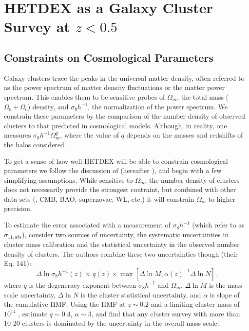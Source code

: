 \section{HETDEX as a Galaxy Cluster Survey at $z < 0.5$}\label{sec:discussion}

\subsection{Constraints on Cosmological Parameters}
Galaxy clusters trace the peaks in the universal matter density, often referred to as the power spectrum of matter density fluctuations or the matter power spectrum. This enables them to be sensitive probes of $\Omega_m$, the total mass ($\Omega_b + \Omega_c$) density, and $\sigma_8h^{-1}$, the normalization of the power spectrum. We constrain these parameters by the comparison of the number density of observed clusters to that predicted in cosmological models. Although, in reality, one measures $\sigma_8h^{-1}\Omega_m^q$, where the value of $q$ depends on the masses and redshifts of the halos considered.

To get a sense of how well HETDEX will be able to constrain cosmological parameters we follow the discussion of \cite{Weinberg2013} (hereafter ), and begin with a few simplifying assumptions. While sensitive to $\Omega_m$, the number density of clusters does not necessarily provide the strongest contraint, but combined with other data sets (\eg, CMB, BAO, supernovae, WL, etc.) it will constrain $\Omega_m$ to higher precision.

To estimate the error associated with a measurement of $\sigma_8h^{-1}$ (which  refer to as $\sigma_{11,abs}$),  consider two sources of uncertainty, the systematic uncertainties in cluster mass calibration and the statistical uncertainty in the observed number density of clusters. The authors combine these two uncertainties though (their Eq. 141):
\begin{equation}
\Delta \ln \sigma_8h^{-1}(z) \approx q(z)\times 
        \max\left[ \Delta \ln M, \alpha(z)^{-1} \Delta \ln N \right].
\label{eq:sigElapprox}
\end{equation}
where $q$ is the degeneracy exponent between $\sigma_8h^{-1}$ and $\Omega_m$, $\Delta \ln M$ is the mass scale uncertainty, $\Delta \ln N$ is the cluster statistical uncertainty, and $\alpha$ is slope of the cumulative HMF. Using the \cite{Tinker2008} HMF at $z\sim0.2$ and a limiting cluster mass of $10^{14}$ \Msol,  estimate $q\sim0.4$, $\alpha\sim3$, and find that any cluster survey with more than 10-20 clusters is dominated by the uncertainty in the overall mass scale.

